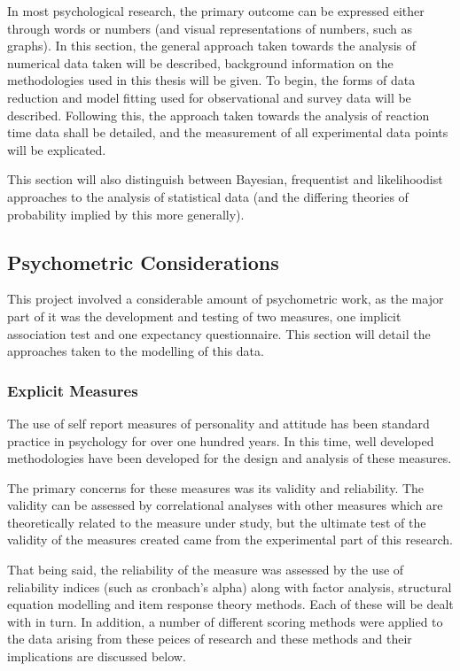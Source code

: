 In most psychological research, the primary outcome can be expressed either through words or numbers (and visual representations of numbers, such as graphs). In this section, the general approach taken towards the analysis of numerical data taken will be described, background information on the methodologies used in this thesis will be given. 
To begin, the forms of data reduction and model fitting used for observational and survey data will be described. Following this, the approach taken towards the analysis of reaction time data shall be detailed, and the measurement of all experimental data points will be explicated. 

This section will also distinguish between Bayesian, frequentist and likelihoodist approaches to the analysis of statistical data (and the differing theories of probability implied by this more generally).

\subsection{Psychometric Considerations}

This project involved a considerable amount of psychometric work, as the major part of it was the development and testing of two measures, one implicit association test and one expectancy questionnaire. This section will detail the approaches taken to the modelling of this data. 


\subsubsection{Explicit Measures}

The use of self report measures of personality and attitude has been standard practice in psychology for over one hundred years. In this time, well developed methodologies have been developed for the design and analysis of these measures. 

The primary concerns for these measures was its validity and reliability. The validity can be assessed by correlational analyses with other measures which are theoretically related to the measure under study, but the ultimate test of the validity of the measures created came from the experimental part of this research. 

That being said, the reliability of the measure was assessed by the use of reliability indices (such as cronbach's alpha) \cite{sass2010comparative} along with factor analysis, structural equation modelling and item response theory methods. Each of these will be dealt with in turn. In addition, a number of different scoring methods were applied to the data arising from these peices of research and these methods and their implications are discussed below.  


